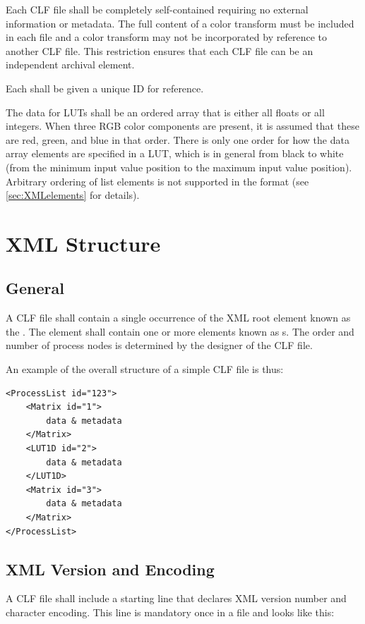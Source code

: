 Each CLF file shall be completely self-contained requiring no external information or metadata. The full content of a color transform must be included in each file and a color transform may not be incorporated by reference to another CLF file. This restriction ensures that each CLF file can be an independent archival element. 

Each  shall be given a unique ID for reference. 

The data for LUTs shall be an ordered array that is either all floats or all integers. When three RGB color components are present, it is assumed that these are red, green, and blue in that order. There is only one order for how the data array elements are specified in a LUT, which is in general from black to white (from the minimum input value position to the maximum input value position). Arbitrary ordering of list elements is not supported in the format (see \autoref{sec:XMLelements} for details).



\section{XML Structure}
\subsection{General}
A CLF file shall contain a single occurrence of the XML root element known as the . 
The  element shall contain one or more elements known as s. The order and number of process nodes is determined by the designer of the CLF file.  

An example of the overall structure of a simple CLF file is thus:

\lstset{frame=none}
\begin{lstlisting}
<ProcessList id="123">
	<Matrix id="1">
		data & metadata
	</Matrix>
	<LUT1D id="2">
 		data & metadata
	</LUT1D>
	<Matrix id="3">
		data & metadata
	</Matrix>
</ProcessList>	
\end{lstlisting}


\subsection{XML Version and Encoding}
A CLF file shall include a starting line that declares XML version number and character encoding. This line is mandatory once in a file and looks like this:


